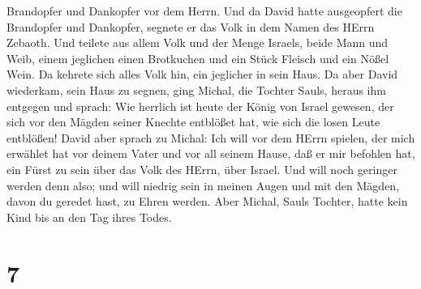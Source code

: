 Brandopfer und Dankopfer vor dem Herrn.  Und da David hatte
ausgeopfert die Brandopfer und Dankopfer, segnete er das Volk in dem
Namen des HErrn Zebaoth.  Und teilete aus allem Volk und
der Menge Israels, beide Mann und Weib, einem jeglichen einen Brotkuchen
und ein Stück Fleisch und ein Nößel Wein. Da kehrete sich alles Volk
hin, ein jeglicher in sein Haus.  Da aber David wiederkam,
sein Haus zu segnen, ging Michal, die Tochter Sauls, heraus ihm entgegen
und sprach: Wie herrlich ist heute der König von Israel gewesen, der
sich vor den Mägden seiner Knechte entblößet hat, wie sich die losen
Leute entblößen!  David aber sprach zu Michal: Ich will vor
dem HErrn spielen, der mich erwählet hat vor deinem Vater und vor all
seinem Hause, daß er mir befohlen hat, ein Fürst zu sein über das Volk
des HErrn, über Israel.  Und will noch geringer werden denn
also; und will niedrig sein in meinen Augen und mit den Mägden, davon du
geredet hast, zu Ehren werden.  Aber Michal, Sauls Tochter,
hatte kein Kind bis an den Tag ihres Todes.

\hypertarget{section-6}{%
\section{7}\label{section-6}}

